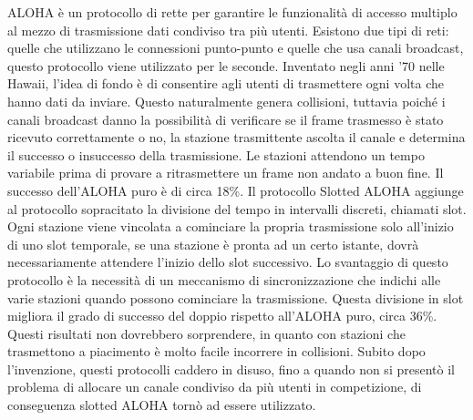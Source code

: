 ALOHA è un protocollo di rette per garantire le funzionalità di accesso multiplo al mezzo di trasmissione dati condiviso tra più utenti. Esistono due tipi di reti: quelle che utilizzano le connessioni punto-punto e quelle che usa canali broadcast, questo protocollo viene utilizzato per le seconde.
Inventato negli anni ’70 nelle Hawaii, l’idea di fondo è di consentire agli utenti di trasmettere ogni volta che hanno dati da inviare. Questo naturalmente genera collisioni, tuttavia poiché i canali broadcast danno la possibilità di verificare se il frame trasmesso è stato ricevuto correttamente o no, la stazione trasmittente ascolta il canale e determina il successo o insuccesso della trasmissione.
Le stazioni attendono un tempo variabile prima di provare a ritrasmettere un frame non andato a buon fine.
Il successo dell’ALOHA puro è di circa 18\%.
Il protocollo Slotted ALOHA aggiunge al protocollo sopracitato la divisione del tempo in intervalli discreti, chiamati slot. Ogni stazione viene vincolata a cominciare la propria trasmissione solo all’inizio di uno slot temporale, se una stazione è pronta ad un certo istante, dovrà necessariamente attendere l’inizio dello slot successivo.
Lo svantaggio di questo protocollo è la necessità di un meccanismo di sincronizzazione che indichi alle varie stazioni quando possono cominciare la trasmissione.
Questa divisione in slot migliora il grado di successo del doppio rispetto all’ALOHA puro, circa 36\%.
Questi risultati non dovrebbero sorprendere, in quanto con stazioni che trasmettono a piacimento è molto facile incorrere in collisioni.
Subito dopo l’invenzione, questi protocolli caddero in disuso, fino a quando non si presentò il problema di allocare un canale condiviso da più utenti in competizione, di conseguenza slotted ALOHA tornò ad essere utilizzato.
  
